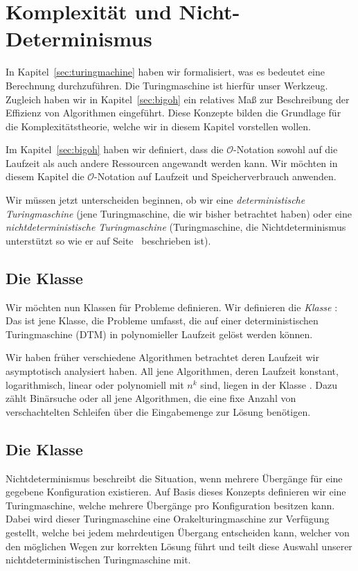 \chapter{Komplexität und Nicht-Determinismus}
%
In Kapitel~\ref{sec:turingmachine} haben wir formalisiert, was es bedeutet eine Berechnung durchzuführen. Die Turingmaschine ist hierfür unser Werkzeug. Zugleich haben wir in Kapitel~\ref{sec:bigoh} ein relatives Maß zur Beschreibung der Effizienz von Algorithmen eingeführt. Diese Konzepte bilden die Grundlage für die Komplexitätstheorie, welche wir in diesem Kapitel vorstellen wollen.

Im Kapitel~\ref{sec:bigoh} haben wir definiert, dass die $\mathcal{O}$-Notation sowohl auf die Laufzeit als auch andere Ressourcen angewandt werden kann. Wir möchten in diesem Kapitel die $\mathcal{O}$-Notation auf Laufzeit und Speicherverbrauch anwenden.

Wir müssen jetzt unterscheiden beginnen, ob wir eine \emph{deterministische Turingmaschine} (jene Turingmaschine, die wir bisher betrachtet haben) oder eine \emph{nichtdeterministische Turingmaschine} (Turingmaschine, die Nichtdeterminismus unterstützt so wie er auf Seite~\pageref{sec:nondeterminism} beschrieben ist).

\section{Die Klasse \cP{}}
%
Wir möchten nun Klassen für Probleme definieren. Wir definieren die \emph{Klasse \cP{}}:
Das ist jene Klasse, die Probleme umfasst, die auf einer deterministischen Turingmaschine (DTM) in polynomieller Laufzeit gelöst werden können.

Wir haben früher verschiedene Algorithmen betrachtet deren Laufzeit wir asymptotisch analysiert haben. All jene Algorithmen, deren Laufzeit konstant, logarithmisch, linear oder polynomiell mit $n^k$ sind, liegen in der Klasse \cP{}. Dazu zählt Binärsuche oder all jene Algorithmen, die eine fixe Anzahl von verschachtelten Schleifen über die Eingabemenge zur Lösung benötigen.

\section{Die Klasse \cNP{}}
%
Nichtdeterminismus beschreibt die Situation, wenn mehrere Übergänge für eine gegebene Konfiguration existieren. Auf Basis dieses Konzepts definieren wir eine Turingmaschine, welche mehrere Übergänge pro Konfiguration besitzen kann. Dabei wird dieser Turingmaschine eine Orakelturingmaschine zur Verfügung gestellt, welche bei jedem mehrdeutigen Übergang entscheiden kann, welcher von den möglichen Wegen zur korrekten Lösung führt und teilt diese Auswahl unserer nichtdeterministischen Turingmaschine mit.

